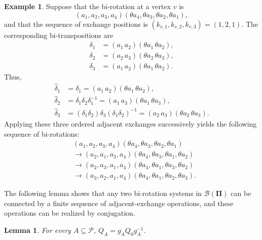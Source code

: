 \documentclass[12pt]{article}
\newtheorem{lemma}[theorem]{Lemma}
\theoremstyle{definition}
\newtheorem{example}[theorem]{Example}
\begin{document}
\begin{example}Suppose that the bi-rotation at a vertex $v$ is
$$(a_1,a_2,a_3,a_4) (\theta a_4,\theta a_3,\theta a_2,\theta a_1),$$
and that the sequence of exchange positions is
$(k_{v,1},k_{v,2},k_{v,3})=(1,2,1).$
The corresponding bi-transpositions are
$$\begin{aligned}
\delta_1&=(a_1\,a_2)(\theta a_1\,\theta a_2),\\
\delta_2&=(a_2\,a_3)(\theta a_2\,\theta a_3),\\
\delta_3&=(a_1\,a_2)(\theta a_1\,\theta a_2).
\end{aligned}$$
Thus, $$\begin{aligned}
\widehat\delta_1 &=\delta_1 =(a_1\,a_2)(\theta a_1\,\theta a_2),\\
\widehat\delta_2 &=\delta_1\delta_2\delta_1^{-1} =(a_1\,a_3)(\theta a_1\,\theta a_3),\\
\widehat\delta_3 &=(\delta_1\delta_2)\delta_3 (\delta_1\delta_2)^{-1} =(a_2\,a_3)(\theta a_2\,\theta a_3).
\end{aligned}$$
Applying these three ordered adjacent exchanges successively yields the following sequence of bi-rotations:
$$\begin{aligned}
&(a_1,a_2,a_3,a_4) (\theta a_4,\theta a_3,\theta a_2,\theta a_1)\\
&\longrightarrow (a_2,a_1,a_3,a_4) (\theta a_4,\theta a_3,\theta a_1,\theta a_2)\\
&\longrightarrow (a_2,a_3,a_1,a_4) (\theta a_4,\theta a_1,\theta a_3,\theta a_2)\\
&\longrightarrow (a_3,a_2,a_1,a_4) (\theta a_4,\theta a_1,\theta a_2,\theta a_3).
\end{aligned}$$
\end{example}


The following lemma shows that any two bi-rotation systems in $\mathcal B(\mathbf{\Pi})$ can be connected by a finite sequence of adjacent-exchange operations, and these operations can be realized by conjugation.

\begin{lemma} \label{lem2:7} For every $A\subseteq\mathcal P$, $Q_A=g_AQ_0g_A^{-1}$.\end{lemma}
\end{document}
